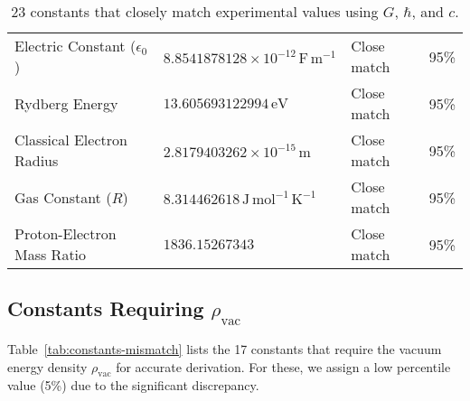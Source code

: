 \documentclass[12pt]{article}
\begin{document}
\begin{table}[htbp]
\begin{tabular}{|l|l|l|l|}
Electric Constant (\( \epsilon_0 \)) & \(8.8541878128 \times 10^{-12}\,\mathrm{F\,m^{-1}}\) & Close match & 95\% \\
Rydberg Energy & \(13.605693122994\,\mathrm{eV}\) & Close match & 95\% \\
Classical Electron Radius & \(2.8179403262 \times 10^{-15}\,\mathrm{m}\) & Close match & 95\% \\
Gas Constant (\( R \)) & \(8.314462618\,\mathrm{J\,mol^{-1}\,K^{-1}}\) & Close match & 95\% \\
Proton-Electron Mass Ratio & \(1836.15267343\) & Close match & 95\% \\
\hline
\end{tabular}
\caption{23 constants that closely match experimental values using \(G\), \(\hbar\), and \(c\).}
\label{tab:constants-close}
\end{table}

\subsection{Constants Requiring \(\rho_{\text{vac}}\)}
Table~\ref{tab:constants-mismatch} lists the 17 constants that require the vacuum energy density \(\rho_{\text{vac}}\) for accurate derivation. For these, we assign a low percentile value (5\%) due to the significant discrepancy.
\end{document}
